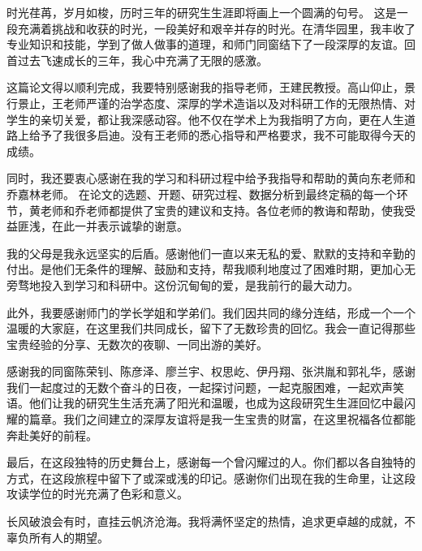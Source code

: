 
\begin{acknowledgements}

时光荏苒，岁月如梭，历时三年的研究生生涯即将画上一个圆满的句号。
这是一段充满着挑战和收获的时光，一段美好和艰辛并存的时光。在清华园里，我丰收了专业知识和技能，学到了做人做事的道理，和师门同窗结下了一段深厚的友谊。回首过去飞速成长的三年，我心中充满了无限的感激。

这篇论文得以顺利完成，我要特别感谢我的指导老师，王建民教授。高山仰止，景行景止，王老师严谨的治学态度、深厚的学术造诣以及对科研工作的无限热情、对学生的亲切关爱，都让我深感动容。他不仅在学术上为我指明了方向，更在人生道路上给予了我很多启迪。没有王老师的悉心指导和严格要求，我不可能取得今天的成绩。

同时，我还要衷心感谢在我的学习和科研过程中给予我指导和帮助的黄向东老师和乔嘉林老师。
在论文的选题、开题、研究过程、数据分析到最终定稿的每一个环节，黄老师和乔老师都提供了宝贵的建议和支持。各位老师的教诲和帮助，使我受益匪浅，在此一并表示诚挚的谢意。

我的父母是我永远坚实的后盾。感谢他们一直以来无私的爱、默默的支持和辛勤的付出。是他们无条件的理解、鼓励和支持，帮我顺利地度过了困难时期，更加心无旁骛地投入到学习和科研中。这份沉甸甸的爱，是我前行的最大动力。

此外，我要感谢师门的学长学姐和学弟们。我们因共同的缘分连结，形成一个一个温暖的大家庭，在这里我们共同成长，留下了无数珍贵的回忆。我会一直记得那些宝贵经验的分享、无数次的夜聊、一同出游的美好。

感谢我的同窗陈荣钊、陈彦泽、廖兰宇、权思屹、伊丹翔、张洪胤和郭礼华，感谢我们一起度过的无数个奋斗的日夜，一起探讨问题，一起克服困难，一起欢声笑语。他们让我的研究生生活充满了阳光和温暖，也成为这段研究生生涯回忆中最闪耀的篇章。我们之间建立的深厚友谊将是我一生宝贵的财富，在这里祝福各位都能奔赴美好的前程。

最后，在这段独特的历史舞台上，感谢每一个曾闪耀过的人。你们都以各自独特的方式，在这段旅程中留下了或深或浅的印记。感谢你们出现在我的生命里，让这段攻读学位的时光充满了色彩和意义。

长风破浪会有时，直挂云帆济沧海。我将满怀坚定的热情，追求更卓越的成就，不辜负所有人的期望。

\end{acknowledgements}

